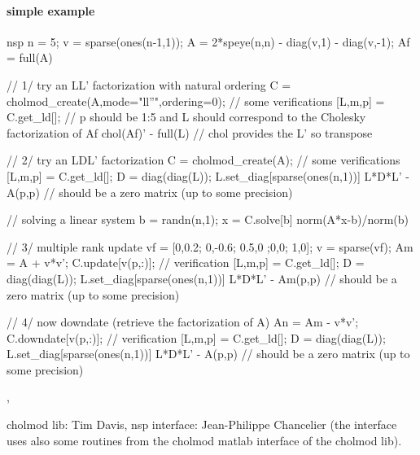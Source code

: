 \begin{examples}
 \paragraph{simple example}
  \begin{mintednsp}{nsp}
n = 5;
v = sparse(ones(n-1,1));
A = 2*speye(n,n) - diag(v,1) - diag(v,-1);
Af = full(A)

// 1/ try an LL' factorization with natural ordering
C = cholmod_create(A,mode="ll''",ordering=0);
// some verifications
[L,m,p] = C.get_ld[];
// p should be 1:5 and L should correspond to the Cholesky factorization of Af
chol(Af)' - full(L)   // chol provides the L' so transpose

// 2/ try an LDL' factorization
C = cholmod_create(A);
// some verifications
[L,m,p] = C.get_ld[];
D = diag(diag(L));
L.set_diag[sparse(ones(n,1))]
L*D*L' - A(p,p)  // should be a zero matrix (up to some precision)

// solving a linear system
b = randn(n,1);
x = C.solve[b]
norm(A*x-b)/norm(b)

// 3/ multiple rank update
vf = [0,0.2; 0,-0.6; 0.5,0 ;0,0; 1,0];
v = sparse(vf);
Am = A + v*v';
C.update[v(p,:)];
// verification
[L,m,p] = C.get_ld[];
D = diag(diag(L));
L.set_diag[sparse(ones(n,1))]
L*D*L' - Am(p,p)  // should be a zero matrix (up to some precision)

// 4/ now downdate (retrieve the factorization of A)
An = Am - v*v';
C.downdate[v(p,:)];
// verification
[L,m,p] = C.get_ld[];
D = diag(diag(L));
L.set_diag[sparse(ones(n,1))]
L*D*L' - A(p,p)  // should be a zero matrix (up to some precision)


  \end{mintednsp}
 \end{examples}

\begin{manseealso}
  ,
\end{manseealso}

\begin{authors}
   cholmod lib: Tim Davis, nsp interface: Jean-Philippe Chancelier (the interface uses also
   some routines from the cholmod matlab interface of the cholmod lib).
\end{authors}
